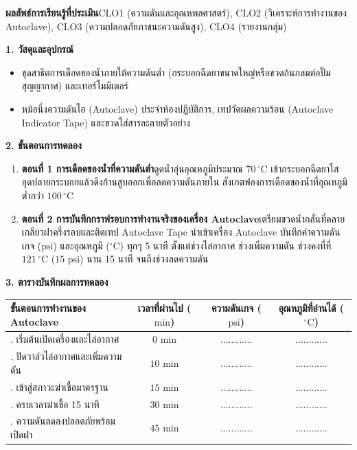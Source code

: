 \begin{labbox}
\noindent\textbf{ผลลัพธ์การเรียนรู้ที่ประเมิน}\quad CLO1 (ความดันและอุณหพลศาสตร์), CLO2 (วิเคราะห์การทำงานของ Autoclave), CLO3 (ความปลอดภัยภาชนะความดันสูง), CLO4 (รายงานกลุ่ม)

\vspace{4pt}
\noindent\textbf{1. วัสดุและอุปกรณ์}
\begin{itemize}
    \item ชุดสาธิตการเดือดของน้ำภายใต้ความดันต่ำ (กระบอกฉีดยาขนาดใหญ่หรือขวดก้นกลมต่อปั๊มสุญญากาศ) และเทอร์โมมิเตอร์
    \item หม้อนึ่งความดันไอ (Autoclave) ประจำห้องปฏิบัติการ, เทปวัดผลความร้อน (Autoclave Indicator Tape) และขวดใส่สารละลายตัวอย่าง
\end{itemize}

\noindent\textbf{2. ขั้นตอนการทดลอง}
\begin{enumerate}
    \item \textbf{ตอนที่ 1 การเดือดของน้ำที่ความดันต่ำ}\quad ดูดน้ำอุ่นอุณหภูมิประมาณ $70\,^\circ\text{C}$ เข้ากระบอกฉีดยาใส อุดปลายกระบอกแล้วดึงก้านสูบออกเพื่อลดความดันภายใน สังเกตฟองการเดือดของน้ำที่อุณหภูมิต่ำกว่า $100\,^\circ\text{C}$
    \item \textbf{ตอนที่ 2 การบันทึกกราฟรอบการทำงานจริงของเครื่อง Autoclave}\quad เตรียมขวดน้ำกลั่นที่คลายเกลียวฝาครึ่งรอบและติดเทป Autoclave Tape นำเข้าเครื่อง Autoclave บันทึกค่าความดันเกจ ($\text{psi}$) และอุณหภูมิ ($^\circ\text{C}$) ทุกๆ 5 นาที ตั้งแต่ช่วงไล่อากาศ ช่วงเพิ่มความดัน ช่วงคงที่ที่ $121\,^\circ\text{C}$ ($15\text{ psi}$) นาน 15 นาที จนถึงช่วงลดความดัน
\end{enumerate}

\noindent\textbf{3. ตารางบันทึกผลการทดลอง}
\begin{center}
\footnotesize\setlength{\tabcolsep}{3.5pt}
\begin{tabularx}{\linewidth}{>{\raggedright\arraybackslash}X c c c}
\toprule
\textbf{ขั้นตอนการทำงานของ Autoclave} & \textbf{เวลาที่ผ่านไป ($\text{min}$)} & \textbf{ความดันเกจ ($\text{psi}$)} & \textbf{อุณหภูมิที่อ่านได้ ($^\circ\text{C}$)} \\
\midrule
1. เริ่มต้นเปิดเครื่องและไล่อากาศ & $0\text{ min}$ & ............ & ............ \\
2. ปิดวาล์วไล่อากาศและเพิ่มความดัน & $10\text{ min}$ & ............ & ............ \\
3. เข้าสู่สภาวะฆ่าเชื้อมาตรฐาน & $15\text{ min}$ & ............ & ............ \\
4. ครบเวลาฆ่าเชื้อ 15 นาที & $30\text{ min}$ & ............ & ............ \\
5. ความดันลดลงปลอดภัยพร้อมเปิดฝา & $45\text{ min}$ & ............ & ............ \\
\bottomrule
\end{tabularx}
\end{center}
\end{labbox}

